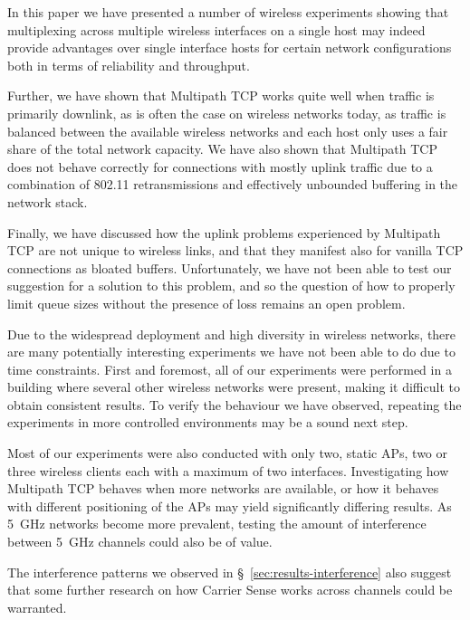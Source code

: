 In this paper we have presented a number of wireless experiments showing that
multiplexing across multiple wireless interfaces on a single host may indeed
provide advantages over single interface hosts for certain network
configurations both in terms of reliability and throughput.

Further, we have shown that Multipath TCP works quite well when traffic is
primarily downlink, as is often the case on wireless networks today, as traffic
is balanced between the available wireless networks and each host only uses a
fair share of the total network capacity. We have also shown that Multipath TCP
does not behave correctly for connections with mostly uplink traffic due to a
combination of 802.11 retransmissions and effectively unbounded buffering in the
network stack.

Finally, we have discussed how the uplink problems experienced by Multipath TCP
are not unique to wireless links, and that they manifest also for vanilla TCP
connections as bloated buffers. Unfortunately, we have not been able to test our
suggestion for a solution to this problem, and so the question of how to
properly limit queue sizes without the presence of loss remains an open problem.

Due to the widespread deployment and high diversity in wireless networks, there
are many potentially interesting experiments we have not been able to do due to
time constraints. First and foremost, all of our experiments were performed in
a building where several other wireless networks were present, making it
difficult to obtain consistent results. To verify the behaviour we have
observed, repeating the experiments in more controlled environments may be a
sound next step.

Most of our experiments were also conducted with only two, static APs, two or
three wireless clients each with a maximum of two interfaces. Investigating how
Multipath TCP behaves when more networks are available, or how it behaves with
different positioning of the APs may yield significantly differing results. As
5~GHz networks become more prevalent, testing the amount of interference between
5~GHz channels could also be of value.

The interference patterns we observed in \S~\ref{sec:results-interference} also
suggest that some further research on how Carrier Sense works across channels
could be warranted.

